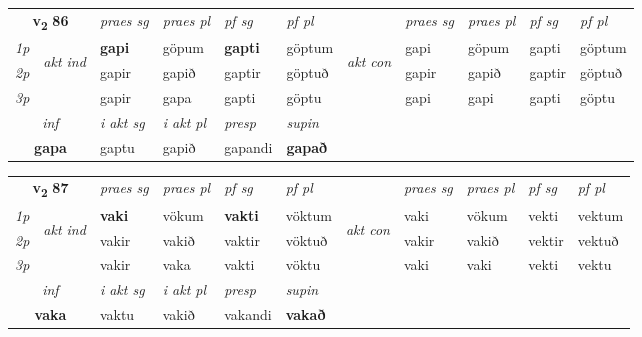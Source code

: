 \noindent
\begin{tabular}{lllllllllll} \toprule
\multicolumn{2}{c}{\textbf{v{\textsubscript{2}}} \Large{\textbf{86}}}  &  \textit{praes sg}  & \textit{praes pl}  &\textit{ pf sg} & \textit{pf pl} &  &  \textit{praes sg}  & \textit{praes pl}  & \textit{pf sg} & \textit{pf pl } \\*
	\cmidrule{3-6} \cmidrule{8-11}
 {\textit{1p}} & \multirow{3}{*}{\begin{turn}{90}\textit{akt ind}\end{turn}} & \textbf{gapi} & göpum & \textbf{gapti} & göptum & \multirow{3}{*}{\begin{turn}{90}\textit{akt con}\end{turn}} &gapi & göpum & gapti & göptum\\*
 {\textit{2p}} &  &  gapir  & gapið & gaptir & göptuð & & gapir & gapið & gaptir & göptuð \\*
{\textit{3p}} &  & gapir & gapa & gapti & göptu & & gapi & gapi& gapti & göptu \\*
\cmidrule{3-6} \cmidrule{8-11}

   \multicolumn{2}{c}{\textit{inf}}  & \textit{i akt sg} & \textit{i akt pl}   & \textit{presp} & \textit{supin}   \\*
  \multicolumn{2}{c}{\textbf{gapa}} & gaptu  & gapið   & gapandi &  \textbf{gapað}   \\*
\end{tabular}

\noindent
\begin{tabular}{lllllllllll} \toprule
\multicolumn{2}{c}{\textbf{v{\textsubscript{2}}} \Large{\textbf{87}}}  &  \textit{praes sg}  & \textit{praes pl}  &\textit{ pf sg} & \textit{pf pl} &  &  \textit{praes sg}  & \textit{praes pl}  & \textit{pf sg} & \textit{pf pl } \\*
	\cmidrule{3-6} \cmidrule{8-11}
 {\textit{1p}} & \multirow{3}{*}{\begin{turn}{90}\textit{akt ind}\end{turn}} & \textbf{vaki} & vökum & \textbf{vakti} & vöktum & \multirow{3}{*}{\begin{turn}{90}\textit{akt con}\end{turn}} &vaki & vökum & vekti & vektum\\*
 {\textit{2p}} &  &  vakir  & vakið & vaktir & vöktuð & & vakir & vakið & vektir & vektuð \\*
{\textit{3p}} &  & vakir & vaka & vakti & vöktu & & vaki & vaki& vekti & vektu \\*
\cmidrule{3-6} \cmidrule{8-11}

   \multicolumn{2}{c}{\textit{inf}}  & \textit{i akt sg} & \textit{i akt pl}   & \textit{presp} & \textit{supin}   \\*
  \multicolumn{2}{c}{\textbf{vaka}} & vaktu  & vakið   & vakandi &  \textbf{vakað}   \\*
\end{tabular}


